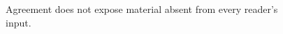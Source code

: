 \begin{figure}[H]
\centering
{}
\caption{Agreement does not expose material absent from every reader's input.}\label{fig:teach-M01-04}
\end{figure}
